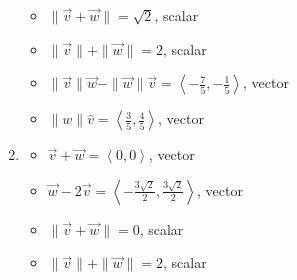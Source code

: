 \documentclass{ximera}
\begin{document}
\begin{enumerate}
\begin{multicols}{2}
\begin{itemize}
\end{itemize}

\end{multicols}

\begin{multicols}{2}

\begin{itemize}

\item $\| \vec{v} + \vec{w} \| = \sqrt{2}$, scalar
\item  $\| \vec{v} \| + \| \vec{w}\| = 2$, scalar

\end{itemize}

\end{multicols}

\begin{multicols}{2}

\begin{itemize}

\item $\| \vec{v} \| \vec{w} - \| \vec{w} \| \vec{v}  = \left<-\frac{7}{5},-\frac{1}{5}\right>$, vector
\item $\|w\| \hat{v}= \left<\frac{3}{5}, \frac{4}{5} \right>$, vector

\end{itemize}

\end{multicols}

\item  

\begin{multicols}{2}

\begin{itemize}

\item  $\vec{v} + \vec{w} = \left<0,0\right> $, vector
\item  $\vec{w}  - 2\vec{v}  = \left<-\frac{3\sqrt{2}}{2}, \frac{3\sqrt{2}}{2} \right>$, vector

\end{itemize}

\end{multicols}

\begin{multicols}{2}

\begin{itemize}

\item $\| \vec{v} + \vec{w} \| = 0$, scalar
\item  $\| \vec{v} \| + \| \vec{w}\| = 2$, scalar


\end{itemize}
\end{multicols}
\end{enumerate}
\end{document}
